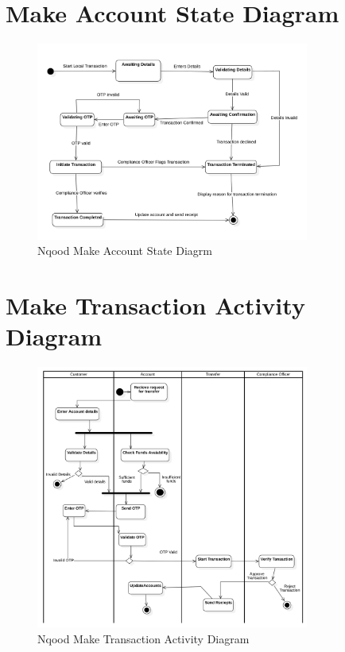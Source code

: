 \documentclass[a4paper]{report}
\begin{document}
\section{Make Account State Diagram}

\begin{figure}[h!]
    \centering
    \includegraphics[width=0.8\textwidth]{images/nqood-account-tx-state-diagram.png}
    \caption{Nqood Make Account State Diagrm}
    \label{fig:nqood-make-account-state-diagram}
\end{figure}

\section{Make Transaction Activity Diagram}

\begin{figure}[h!]
    \centering
    \includegraphics[width=0.8\textwidth]{images/nqood-make-tx-activity-diagram.png}
    \caption{Nqood Make Transaction Activity Diagram}
    \label{fig:nqood-make-transaction-activity-diagram}
\end{figure}
\end{document}
